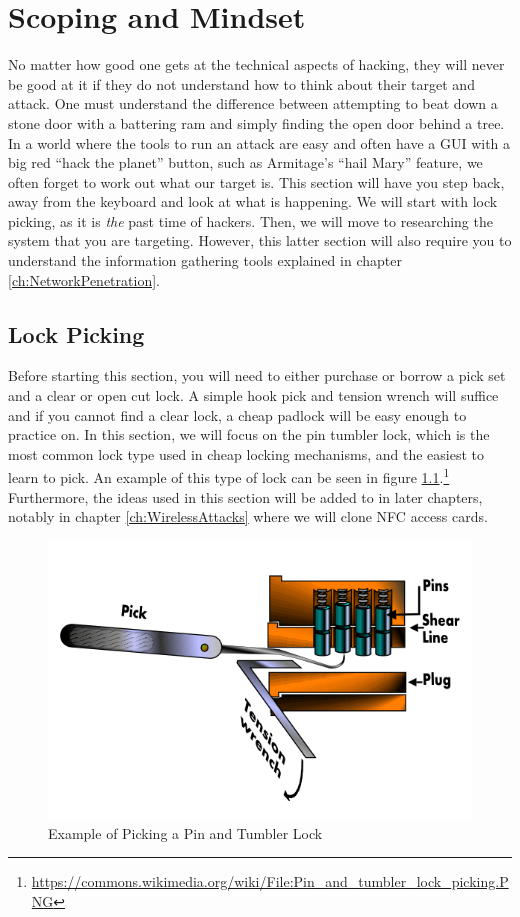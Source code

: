 \chapter{Scoping and Mindset}
	\label{ch:ScopingMindset}
		No matter how good one gets at the technical aspects of hacking, they will never be good at it if they do not understand how to think about their target and attack. 
		One must understand the difference between attempting to beat down a stone door with a battering ram and simply finding the open door behind a tree. 
		In a world where the tools to run an attack are easy and often have a GUI with a big red ``hack the planet'' button, 
		such as Armitage's ``hail Mary'' feature, we often forget to work out what our target is. 
		This section will have you step back, away from the keyboard and look at what is happening. 
		We will start with lock picking, as it is \emph{the} past time of hackers. 
		Then, we will move to researching the system that you are targeting. 
		However, this latter section will also require you to understand the information gathering tools explained in chapter \ref{ch:NetworkPenetration}.
	\section{Lock Picking}
		Before starting this section, you will need to either purchase or borrow a pick set and a clear or open cut lock. 
		A simple hook pick and tension wrench will suffice and if you cannot find a clear lock, a cheap padlock will be easy enough to practice on. 
		In this section, we will focus on the pin tumbler lock, which is the most common lock type used in cheap locking mechanisms, and the easiest to learn to pick. 
		An example of this type of lock can be seen in figure \ref{fig:PinTumblerLock}.\footnote{\url{https://commons.wikimedia.org/wiki/File:Pin\_and\_tumbler\_lock\_picking.PNG}}
		Furthermore, the ideas used in this section will be added to in later chapters, notably in chapter \ref{ch:WirelessAttacks} where we will clone NFC access cards. 
		\begin{figure}[htb]
			\centering
			\includegraphics[scale=0.6]{./PinTumblerLock.png}
			\caption{Example of Picking a Pin and Tumbler Lock}
			\label{fig:PinTumblerLock}
		\end{figure}
